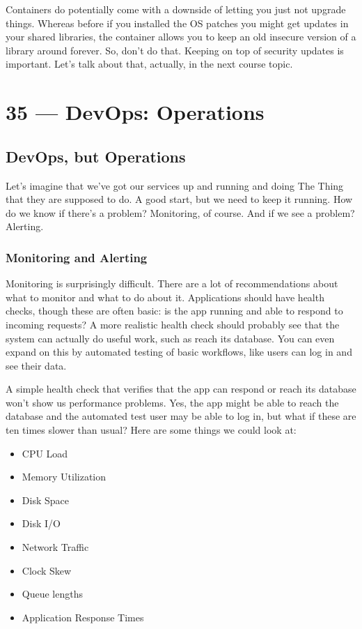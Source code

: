 \documentclass[a4paper]{report}
\begin{document}
Containers do potentially come with a downside of letting you just not upgrade things. Whereas before if you installed the OS patches you might get updates in your shared libraries, the container allows you to keep an old insecure version of a library around forever. So, don't do that. Keeping on top of security updates is important. Let's talk about that, actually, in the next course topic.









\chapter*{35 --- DevOps: Operations}


\section*{DevOps, but Operations}

Let's imagine that we've got our services up and running and doing The Thing that they are supposed to do. A good start, but we need to keep it running. How do we know if there's a problem? Monitoring, of course. And if we see a problem? Alerting.

\subsection*{Monitoring and Alerting}

Monitoring is surprisingly difficult. There are a lot of recommendations about what to monitor and what to do about it. Applications should have health checks, though these are often basic: is the app running and able to respond to incoming requests? A more realistic health check should probably see that the system can actually do useful work, such as reach its database. You can even expand on this by automated testing of basic workflows, like users can log in and see their data.

A simple health check that verifies that the app can respond or reach its database won't show us performance problems. Yes, the app might be able to reach the database and the automated test user may be able to log in, but what if these are ten times slower than usual? Here are some things we could look at:

\begin{multicols}{2}
\begin{itemize}
	\item CPU Load
	\item Memory Utilization
	\item Disk Space
	\item Disk I/O
	\item Network Traffic
	\item Clock Skew
	\item Queue lengths
	\item Application Response Times
\end{itemize}
\end{multicols}
\end{document}
